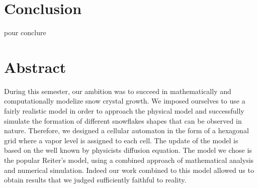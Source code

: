 \documentclass[a4paper,12pt,twoside]{report}
\begin{document}
\chapter{Conclusion}
pour conclure
\chapter*{Abstract}During this semester, our ambition was to succeed in mathematically and computationally modelize snow crystal growth. We imposed ourselves to use a fairly realistic model in order to approach the physical model and successfully simulate the formation of different snowflakes shapes that can be observed in nature.
\medbreak
Therefore, we designed a cellular automaton in the form of a hexagonal grid where a vapor level is assigned to each cell. The update of the model is based on the well known by physicists diffusion equation.
\medbreak
The model we chose is the popular Reiter’s model, using a combined approach of mathematical analysis and numerical simulation. Indeed our work combined to this model allowed us to obtain results that we judged sufficiently faithful to reality.
\end{document}
